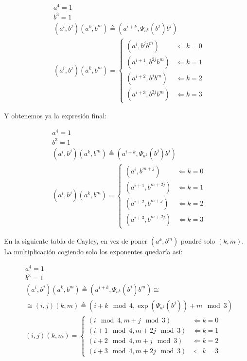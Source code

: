 \documentclass[12pt,a4paper,fleqn,spanish,final,openright]{extbook}
\theoremstyle{definition}
\theoremstyle{remark}
\begin{document}
\begin{align*}
& a^4=1 \\
& b^3=1 \\
& (a^i,b^j)(a^k,b^m) \triangleq (a^{i+k} ,{\Psi }_{a^k}(b^j) {b^{j}}) \\
&
(a^i,b^j)(a^k,b^m) =
	\begin{cases}
		\left( a^{i  } , {b^{j}} {b^m} \right)   &   \Leftarrow    k=0\\
		\left( a^{i+1} , {b^{2j}}{b^m} \right)   &   \Leftarrow    k=1\\
		\left( a^{i+2} , {b^{j}} {b^m} \right)   &   \Leftarrow    k=2\\
		\left( a^{i+3} , {b^{2j}}{b^m} \right)   &   \Leftarrow    k=3
	\end{cases}
\end{align*}


Y obtenemos ya la expresión final:


\begin{align*}
& a^4=1 \\
& b^3=1 \\
& (a^i,b^j)(a^k,b^m) \triangleq (a^{i+k} ,{\Psi }_{a^k}(b^j) {b^{j}}) \\
&
(a^i,b^j)(a^k,b^m) =
	\begin{cases}
		\left( a^{i  } , {b^{m+j}}  \right)   &   \Leftarrow    k=0\\
		\left( a^{i+1} , {b^{m+2j}} \right)   &   \Leftarrow    k=1\\
		\left( a^{i+2} , {b^{m+j}}  \right)   &   \Leftarrow    k=2\\
		\left( a^{i+3} , {b^{m+2j}} \right)   &   \Leftarrow    k=3
	\end{cases}
\end{align*}


En la siguiente tabla de Cayley, en vez de poner $(a^k,b^m)$
pondré solo $(k,m)$. La multiplicación cogiendo solo los
exponentes quedaría así:


\begin{align*}
& a^4=1 \\
& b^3=1 \\
& (a^i,b^j)(a^k,b^m) \triangleq (a^{i+k} ,{\Psi }_{a^k}(b^j) {b^{m}})    \cong   \\
&    \cong     (i,j)(k,m) \triangleq ({i+k}\mod 4 ,\exp{({\Psi }_{a^k}(b^j))}+m \mod 3) \\
&
(i,j)(k,m) =
	\begin{cases}
		\left( {i  }\mod 4 , {m+j}  \mod 3 \right)   &   \Leftarrow    k=0\\
		\left( {i+1}\mod 4 , {m+2j} \mod 3 \right)   &   \Leftarrow    k=1\\
		\left( {i+2}\mod 4 , {m+j}  \mod 3 \right)   &   \Leftarrow    k=2\\
		\left( {i+3}\mod 4 , {m+2j} \mod 3 \right)   &   \Leftarrow    k=3
	\end{cases}
\end{align*}
\end{document}
